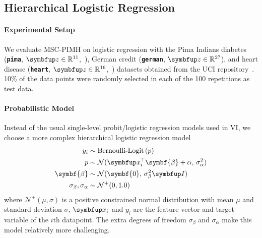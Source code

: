 
\subsection{Hierarchical Logistic Regression}\label{section:logistic}
\vspace{-0.05in}
\paragraph{Experimental Setup}
We evaluate MSC-PIMH on logistic regression with the Pima Indians diabetes (\textbf{\texttt{pima}}, \(\vz \in \mathbb{R}^{11}\),~\citealt{smith_using_1988}), German credit (\textbf{\texttt{german}}, \(\vz \in \mathbb{R}^{27}\)), and heart disease (\textbf{\texttt{heart}}, \(\vz \in \mathbb{R}^{16}\),~\citealt{detrano_international_1989}) datasets obtained from the UCI repository~\citep{Dua:2019}.
10\% of the data points were randomly selected in each of the 100 repetitions as test data.

\vspace{-0.1in}
\paragraph{Probabilistic Model}
Instead of the usual single-level probit/logistic regression models used in VI, we choose a more complex hierarchical logistic regression model 
%
\begin{align*}
y_i &\sim \text{Bernoulli-Logit}\,(p) \\
p &\sim \mathcal{N}(\vx_i^{\top}\symbf{\beta} + \alpha,\, \sigma_{\alpha}^2) \\
\symbf{\beta} &\sim \mathcal{N}(\symbf{0},\, \sigma_{\beta}^2 \mI) \\
\sigma_{\beta}, \sigma_{\alpha} &\sim \mathcal{N}^{+}(0, 1.0)
\end{align*}
%
where \(\mathcal{N}^+(\mu, \sigma)\) is a positive constrained normal distribution with mean \(\mu\) and standard deviation \(\sigma\), \(\vx_i\) and \(y_i\) are the feature vector and target variable of the \(i\)th datapoint.
The extra degrees of freedom \(\sigma_{\beta}\) and \(\sigma_{\alpha}\) make this model relatively more challenging.

